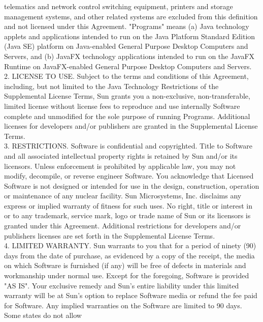 {   telematics and network control switching equipment, printers and
   storage management systems, and other related systems are excluded
   from this definition and not licensed under this
   Agreement. "Programs" means (a) Java technology applets and
   applications intended to run on the Java Platform Standard Edition
   (Java SE) platform on Java-enabled General Purpose Desktop
   Computers and Servers, and (b) JavaFX technology applications
   intended to run on the JavaFX Runtime on JavaFX-enabled General
   Purpose Desktop Computers and Servers.
\\[4pt]
   2. LICENSE TO USE. Subject to the terms and conditions of this
   Agreement, including, but not limited to the Java Technology
   Restrictions of the Supplemental License Terms, Sun grants you a
   non-exclusive, non-transferable, limited license without license
   fees to reproduce and use internally Software complete and
   unmodified for the sole purpose of running Programs. Additional
   licenses for developers and/or publishers are granted in the
   Supplemental License Terms.
\\[4pt]
   3. RESTRICTIONS. Software is confidential and copyrighted. Title to
   Software and all associated intellectual property rights is
   retained by Sun and/or its licensors. Unless enforcement is
   prohibited by applicable law, you may not modify, decompile, or
   reverse engineer Software. You acknowledge that Licensed Software
   is not designed or intended for use in the design, construction,
   operation or maintenance of any nuclear facility. Sun Microsystems,
   Inc. disclaims any express or implied warranty of fitness for such
   uses. No right, title or interest in or to any trademark, service
   mark, logo or trade name of Sun or its licensors is granted under
   this Agreement. Additional restrictions for developers and/or
   publishers licenses are set forth in the Supplemental License
   Terms.
\\[4pt]
   4. LIMITED WARRANTY. Sun warrants to you that for a period of
   ninety (90) days from the date of purchase, as evidenced by a copy
   of the receipt, the media on which Software is furnished (if any)
   will be free of defects in materials and workmanship under normal
   use. Except for the foregoing, Software is provided "AS IS". Your
   exclusive remedy and Sun's entire liability under this limited
   warranty will be at Sun's option to replace Software media or
   refund the fee paid for Software. Any implied warranties on the
   Software are limited to 90 days. Some states do not allow
}
